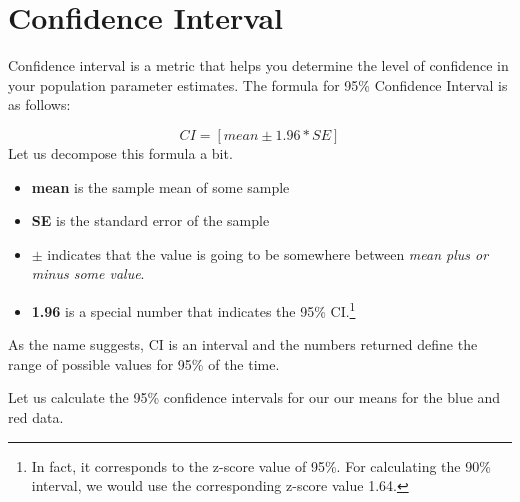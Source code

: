 \documentclass[
]{book}
\providecommand{\tightlist}{%
  \setlength{\itemsep}{0pt}\setlength{\parskip}{0pt}}
\begin{document}
\hypertarget{confidence-interval}{%
\section{Confidence Interval}\label{confidence-interval}}

Confidence interval is a metric that helps you determine the level of confidence in your population parameter estimates. The formula for 95\% Confidence Interval is as follows:

\[CI = [mean \pm 1.96 * SE ]\]
Let us decompose this formula a bit.

\begin{itemize}
\tightlist
\item
  \textbf{mean} is the sample mean of some sample
\item
  \textbf{SE} is the standard error of the sample
\item
  \(\pm\) indicates that the value is going to be somewhere between \emph{mean plus or minus some value}.
\item
  \textbf{1.96} is a special number that indicates the 95\% CI.\footnote{In fact, it corresponds to the z-score value of 95\%. For calculating the 90\% interval, we would use the corresponding z-score value 1.64.}
\end{itemize}

As the name suggests, CI is an interval and the numbers returned define the range of possible values for 95\% of the time.

Let us calculate the 95\% confidence intervals for our our means for the blue and red data.
\end{document}
